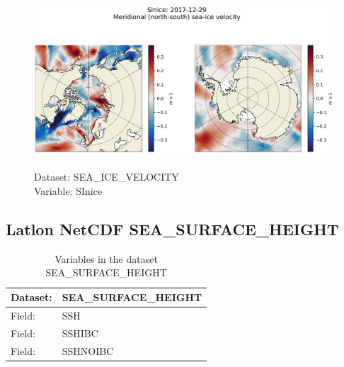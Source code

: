 \begin{figure}[H]
\centering
\includegraphics[scale=0.5]{../images/plots/latlon_plots/Sea-Ice_Velocity/SInice.png}
\caption{\\Dataset: SEA\_ICE\_VELOCITY\\Variable: SInice}
\label{tab:table-SEA_ICE_VELOCITY_SInice-Plot}
\end{figure}
\pagebreak
\subsection{Latlon NetCDF SEA\_SURFACE\_HEIGHT}
\newp
\begin{longtable}{|p{}|p{}|}
\caption{Variables in the dataset SEA\_SURFACE\_HEIGHT}
\label{tab:table-SEA_SURFACE_HEIGHT-fields} \\ 
\hline \endhead \hline \endfoot
\rowcolor{lightgray} \textbf{Dataset:} & \textbf{SEA\_SURFACE\_HEIGHT} \\ \hline
Field: &SSH \\ \hline
Field: &SSHIBC \\ \hline
Field: &SSHNOIBC \\ \hline
\end{longtable}

\pagebreak
